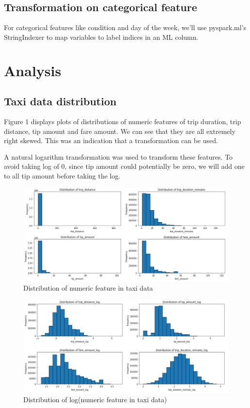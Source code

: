 \documentclass[11pt]{article}
\begin{document}
\subsection{Transformation on categorical feature}
For categorical features like condition and day of the week, we'll use pyspark.ml's StringIndexer to map variables to label indices in an ML column.

\section{Analysis}
\subsection{Taxi data distribution}
Figure 1 displays plots of distributions of numeric features of trip duration, trip distance, tip amount and fare amount. We can see that they are all extremely right skewed. This was an indication that a transformation can be used. 

A natural logarithm transformation was used to transform these features. To avoid taking log of 0, since tip amount could potentially be zero, we will add one to all tip amount before taking the log.
\begin{figure}[h]

    \includegraphics[width=1\textwidth]{plots/distribution.png}
    \centering
    \caption{Distribution of numeric feature in taxi data} %
\end{figure}
\begin{figure}[h]

    \includegraphics[width=1\textwidth]{plots/loged_distribution.png}
    \centering
    \caption{Distribution of log(numeric feature in taxi data)} %
\end{figure}
\end{document}
